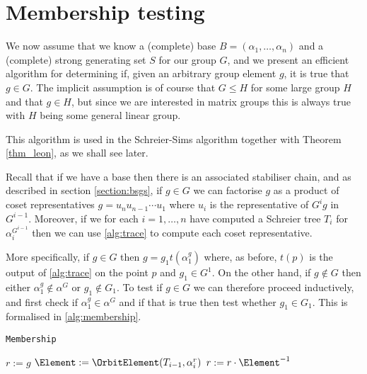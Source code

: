 \section{Membership testing}
We now assume that we know a (complete) base $B = (\alpha_1, \dotsc,
\alpha_n)$ and a (complete) strong generating set $S$ for our group
$G$, and we present an efficient algorithm for determining if, given
an arbitrary group element $g$, it is true that $g \in G$. The
implicit assumption is of course that $G \leq H$ for some large group
$H$ and that $g \in H$, but since we are interested in matrix groups
this is always true with $H$ being some general linear group.

This algorithm is used in the Schreier-Sims algorithm together with
Theorem \ref{thm_leon}, as we shall see later. 

Recall that if we have a base then there is an associated stabiliser
chain, and as described in section \ref{section:bsgs}, if $g \in G$ we
can factorise $g$ as a product of coset representatives $g = u_n u_{n - 1}
\dotsm u_1$ where $u_i$ is the representative of $G^i g$ in $G^{i -
  1}$. Moreover, if we for each $i = 1, \dotsc, n$ have computed a
Schreier tree $T_i$ for $\alpha_i^{G^{i - 1}}$ then we can use
\ref{alg:trace} to compute each coset representative.

More specifically, if $g \in G$ then $g = g_1 t(\alpha_1^g)$ where, as
before, $t(p)$ is the output of \ref{alg:trace} on the point $p$ and
$g_1 \in G^1$. On the other hand, if $g \notin G$ then either
$\alpha_1^g \notin \alpha^G$ or $g_1 \notin G_1$. To test if $g \in G$
we can therefore proceed inductively, and first check if $\alpha_1^g
\in \alpha^G$ and if that is true then test whether $g_1 \in G_1$.
This is formalised in \ref{alg:membership}.

\begin{algorithm} 
\dontprintsemicolon
\caption{\texttt{Membership}}
\Begin
{
  $r := g$ \;
  {
    {
    }
    $\Element := \OrbitElement(T_{i - 1}, \alpha_i^r)$ \;
    $r := r \cdot \Element^{-1}$ \;
  }
   \label{alg:membership_return}
}
\label{alg:membership}
\end{algorithm}

